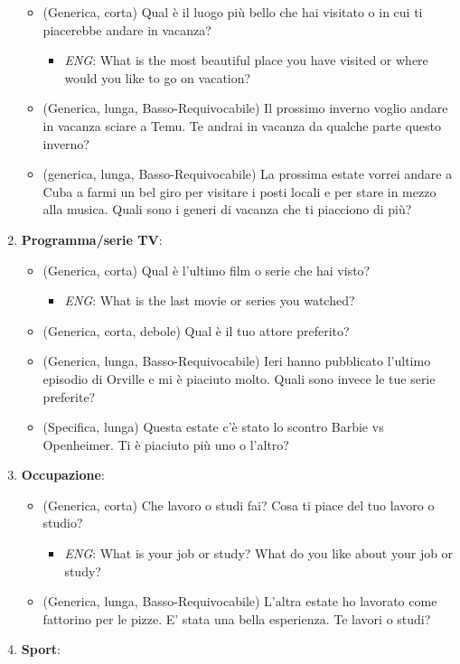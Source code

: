\documentclass[
]{article}
\providecommand{\tightlist}{%
  \setlength{\itemsep}{0pt}\setlength{\parskip}{0pt}}
\begin{document}
\begin{enumerate}
  \begin{itemize}
  \tightlist
  \item
    (Generica, corta) Qual è il luogo più bello che hai visitato o in cui ti piacerebbe andare in vacanza?

    \begin{itemize}
    \tightlist
    \item
      \emph{ENG}: What is the most beautiful place you have visited or where would you like to go on vacation?
    \end{itemize}
  \item
    (Generica, lunga, Basso-Requivocabile) Il prossimo inverno voglio andare in vacanza sciare a Temu. Te andrai in vacanza da qualche parte questo inverno?
  \item
    (generica, lunga, Basso-Requivocabile) La prossima estate vorrei andare a Cuba a farmi un bel giro per visitare i posti locali e per stare in mezzo alla musica. Quali sono i generi di vacanza che ti piacciono di più?
  \end{itemize}
\item
  \textbf{Programma/serie TV}:

  \begin{itemize}
  \tightlist
  \item
    (Generica, corta) Qual è l'ultimo film o serie che hai visto?

    \begin{itemize}
    \tightlist
    \item
      \emph{ENG}: What is the last movie or series you watched?
    \end{itemize}
  \item
    (Generica, corta, debole) Qual è il tuo attore preferito?
  \item
    (Generica, lunga, Basso-Requivocabile) Ieri hanno pubblicato l'ultimo episodio di Orville e mi è piaciuto molto. Quali sono invece le tue serie preferite?
  \item
    (Specifica, lunga) Questa estate c'è stato lo scontro Barbie vs Openheimer. Ti è piaciuto più uno o l'altro?
  \end{itemize}
\item
  \textbf{Occupazione}:

  \begin{itemize}
  \tightlist
  \item
    (Generica, corta) Che lavoro o studi fai? Cosa ti piace del tuo lavoro o studio?

    \begin{itemize}
    \tightlist
    \item
      \emph{ENG}: What is your job or study? What do you like about your job or study?
    \end{itemize}
  \item
    (Generica, lunga, Basso-Requivocabile) L'altra estate ho lavorato come fattorino per le pizze. E' stata una bella esperienza. Te lavori o studi?
  \end{itemize}
\item
  \textbf{Sport}:


\end{enumerate}
\end{document}
